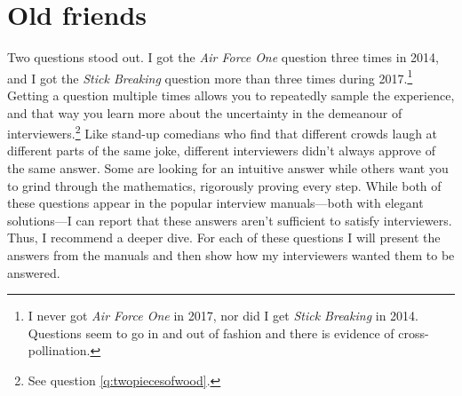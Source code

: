 \documentclass[a4paper]{article}
\begin{document}
\clearpage


\clearpage
\section{Old friends}
Two questions stood out.
I got the \emph{Air Force One} question three times in 2014, and I got the \emph{Stick Breaking} question more than three times during 2017.\footnote{I never got \emph{Air Force One} in 2017, nor did I get \emph{Stick Breaking} in 2014. Questions seem to go in and out of fashion and there is evidence of cross-pollination.}
Getting a question multiple times allows you to repeatedly sample the experience, and that way you learn more about the uncertainty in the demeanour of interviewers.\footnote{See question \ref{q:twopiecesofwood}.}
Like stand-up comedians who find that different crowds laugh at different parts of the same joke, different interviewers didn't always approve of the same answer.
Some are looking for an intuitive answer  while others want you to grind through the mathematics, rigorously proving every step.
While both of these questions appear in the popular interview manuals---both with elegant solutions---I can report that these answers aren't sufficient to satisfy interviewers.
Thus, I recommend a deeper dive.
For each of these questions I will present the answers from the manuals and then show how my interviewers wanted them to be answered.
\end{document}
